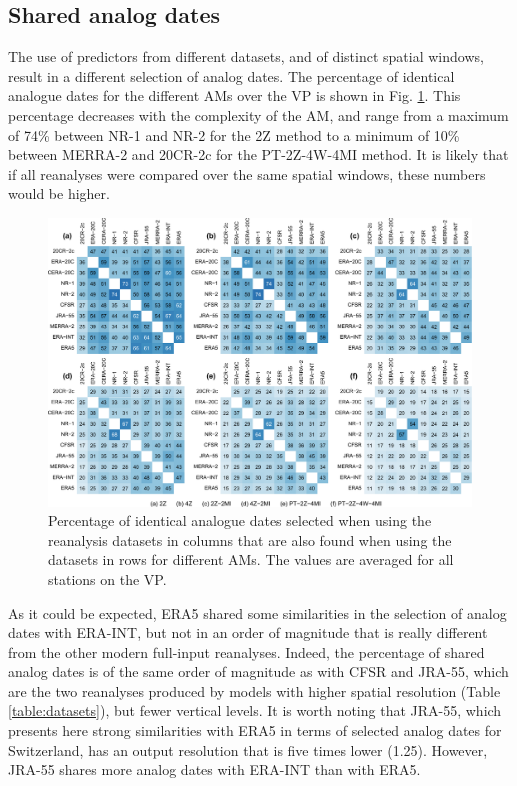 \documentclass[alpha-refs]{wiley-article}
\begin{document}
\subsection{Shared analog dates}
\label{sec:results_shared_dates}

The use of predictors from different datasets, and of distinct spatial windows, result in a different selection of analog dates. The percentage of identical analogue dates for the different AMs over the VP is shown in Fig. \ref{fig:shared-dates}. This percentage decreases with the complexity of the AM, and range from a maximum of 74\% between NR-1 and NR-2 for the 2Z method to a minimum of 10\% between MERRA-2 and 20CR-2c for the PT-2Z-4W-4MI method. It is likely that if all reanalyses were compared over the same spatial windows, these numbers would be higher.

\begin{figure}[bt]
	\centering
	\includegraphics[width=120mm]{figures/similar-dates.pdf}
	\caption{Percentage of identical analogue dates selected when using the reanalysis datasets in columns that are also found when using the datasets in rows for different AMs. The values are averaged for all stations on the VP.}
	\label{fig:shared-dates}
\end{figure}

As it could be expected, ERA5 shared some similarities in the selection of analog dates with ERA-INT, but not in an order of magnitude that is really different from the other modern full-input reanalyses. Indeed, the percentage of shared analog dates is of the same order of magnitude as with CFSR and JRA-55, which are the two reanalyses produced by models with higher spatial resolution (Table \ref{table:datasets}), but fewer vertical levels. It is worth noting that JRA-55, which presents here strong similarities with ERA5 in terms of selected analog dates for Switzerland, has an output resolution that is five times lower (1.25\degree). However, JRA-55 shares more analog dates with ERA-INT than with ERA5. 
\end{document}
